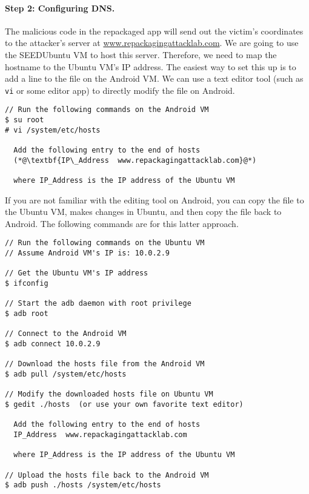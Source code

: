 \paragraph{Step 2: Configuring DNS.} The malicious code in the 
repackaged app will send out the victim's coordinates to 
the attacker's server at \url{www.repackagingattacklab.com}. 
We are going to use the SEEDUbuntu VM to host this server. Therefore, 
we need to map the hostname to the Ubuntu VM's IP address. 
The easiest way to set this up is to add a line to the  file 
on the Android VM. We can use a text editor tool (such as \texttt{vi} or
some editor app) to directly modify the file on Android. 

\begin{lstlisting}
// Run the following commands on the Android VM
$ su root
# vi /system/etc/hosts

  Add the following entry to the end of hosts
  (*@\textbf{IP\_Address  www.repackagingattacklab.com}@*)

  where IP_Address is the IP address of the Ubuntu VM 
\end{lstlisting}


If you are not
familiar with the editing tool on Android, you can copy the file 
to the Ubuntu VM, makes changes in Ubuntu, and then copy the file back to
Android. The following commands are for this latter approach. 

\begin{lstlisting}
// Run the following commands on the Ubuntu VM
// Assume Android VM's IP is: 10.0.2.9

// Get the Ubuntu VM's IP address 
$ ifconfig

// Start the adb daemon with root privilege 
$ adb root 

// Connect to the Android VM
$ adb connect 10.0.2.9 

// Download the hosts file from the Android VM
$ adb pull /system/etc/hosts

// Modify the downloaded hosts file on Ubuntu VM
$ gedit ./hosts  (or use your own favorite text editor)

  Add the following entry to the end of hosts
  IP_Address  www.repackagingattacklab.com

  where IP_Address is the IP address of the Ubuntu VM 

// Upload the hosts file back to the Android VM
$ adb push ./hosts /system/etc/hosts
\end{lstlisting}



